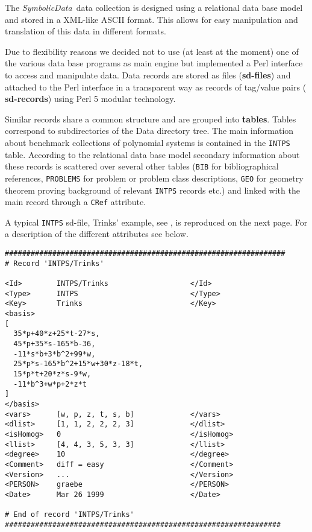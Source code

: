 \documentclass[11pt]{article}
\newcommand{\SD}{{\em Symbo\-lic\-Data}}
\begin{document}
The \SD\ data collection is designed using a relational data base
model and stored in a XML-like ASCII format. This allows for easy
manipulation and translation of this data in different formats. 

Due to flexibility reasons we decided not to use (at least at the
moment) one of the various data base programs as main engine but
implemented a Perl interface to access and manipulate data. Data
records are stored as files ({\bf sd-files}) and attached to the Perl
interface in a transparent way as records of tag/value pairs ({\bf
sd-records}) using Perl 5 modular technology.

Similar records share a common structure and are grouped into {\bf
tables}.  Tables correspond to subdirectories of the Data directory
tree. The main information about benchmark collections of polynomial
systems is contained in the {\tt INTPS} table. According to the
relational data base model secondary information about these records
is scattered over several other tables ({\tt BIB} for
biblio\-graphical references, {\tt PROBLEMS} for problem or problem
class descriptions, {\tt GEO} for geometry theorem proving background
of relevant {\tt INTPS} records etc.) and linked with the main record
through a {\tt CRef} attribute.  

A typical {\tt INTPS} sd-file, Trinks' example, see \cite{Boege_86a},
is reproduced on the next page. For a description of the different
attributes see below.

\begin{table}[ht]
{\small\begin{verbatim}
#################################################################
# Record 'INTPS/Trinks'

<Id>        INTPS/Trinks                   </Id>
<Type>      INTPS                          </Type>
<Key>       Trinks                         </Key>
<basis>
[
  35*p+40*z+25*t-27*s,
  45*p+35*s-165*b-36,
  -11*s*b+3*b^2+99*w,
  25*p*s-165*b^2+15*w+30*z-18*t,
  15*p*t+20*z*s-9*w,
  -11*b^3+w*p+2*z*t
]
</basis>
<vars>      [w, p, z, t, s, b]             </vars>
<dlist>     [1, 1, 2, 2, 2, 3]             </dlist>
<isHomog>   0                              </isHomog>
<llist>     [4, 4, 3, 5, 3, 3]             </llist>
<degree>    10                             </degree>
<Comment>   diff = easy                    </Comment>
<Version>   ...                            </Version>
<PERSON>    graebe                         </PERSON>
<Date>      Mar 26 1999                    </Date>

# End of record 'INTPS/Trinks'
################################################################
\end{verbatim}}
\end{table}
\end{document}
